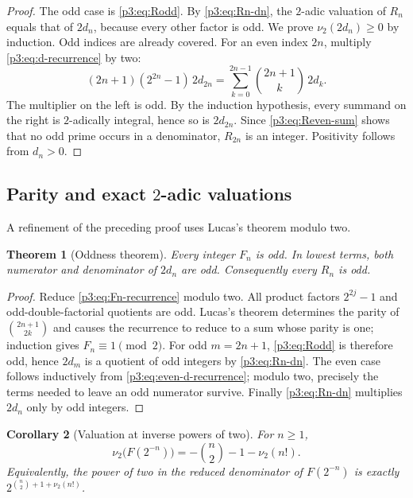 \documentclass[11pt]{article}
\numberwithin{equation}{section}
\newtheorem{theorem}{Theorem}[section]
\newtheorem{corollary}[theorem]{Corollary}
\theoremstyle{definition}
\theoremstyle{remark}
\begin{document}
\begin{proof}
The odd case is \eqref{p3:eq:Rodd}.  By \eqref{p3:eq:Rn-dn}, the $2$-adic valuation of $R_n$ equals that of $2d_n$, because every other factor is odd.  We prove $\nu_2(2d_n)\ge0$ by induction.  Odd indices are already covered.  For an even index $2n$, multiply \eqref{p3:eq:d-recurrence} by two:
\begin{equation}\label{p3:eq:even-d-recurrence}
 (2n+1)(2^{2n}-1)\,2d_{2n}
 =\sum_{k=0}^{2n-1}\binom{2n+1}{k}\,2d_k.
\end{equation}
The multiplier on the left is odd.  By the induction hypothesis, every summand on the right is $2$-adically integral, hence so is $2d_{2n}$.  Since \eqref{p3:eq:Reven-sum} shows that no odd prime occurs in a denominator, $R_{2n}$ is an integer.  Positivity follows from $d_n>0$.
\end{proof}

\subsection{Parity and exact $2$-adic valuations}

A refinement of the preceding proof uses Lucas's theorem modulo two.

\begin{theorem}[Oddness theorem]\label{p3:thm:oddness}
Every integer $F_n$ is odd.  In lowest terms, both numerator and denominator of $2d_n$ are odd.  Consequently every $R_n$ is odd.
\end{theorem}

\begin{proof}
Reduce \eqref{p3:eq:Fn-recurrence} modulo two.  All product factors $2^{2j}-1$ and odd-double-factorial quotients are odd.  Lucas's theorem determines the parity of $\binom{2n+1}{2k}$ and causes the recurrence to reduce to a sum whose parity is one; induction gives $F_n\equiv1\pmod2$.  For odd $m=2n+1$, \eqref{p3:eq:Rodd} is therefore odd, hence $2d_m$ is a quotient of odd integers by \eqref{p3:eq:Rn-dn}.  The even case follows inductively from \eqref{p3:eq:even-d-recurrence}; modulo two, precisely the terms needed to leave an odd numerator survive.  Finally \eqref{p3:eq:Rn-dn} multiplies $2d_n$ only by odd integers.
\end{proof}

\begin{corollary}[Valuation at inverse powers of two]\label{p3:cor:inverse-dyadic-valuation}
For $n\ge1$,
\begin{equation}\label{p3:eq:inverse-dyadic-valuation}
 \nu_2\bigl(F(2^{-n})\bigr)
 =-\binom n2-1-\nu_2(n!).
\end{equation}
Equivalently, the power of two in the reduced denominator of $F(2^{-n})$ is exactly
$2^{\binom n2+1+\nu_2(n!)}$.
\end{corollary}
\end{document}
